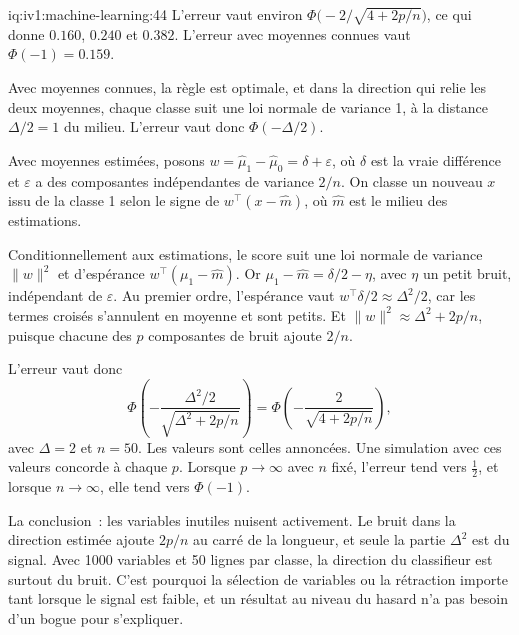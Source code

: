 \begin{solution}{iq:iv1:machine-learning:44}
L'erreur vaut environ $\Phi\bigl(-2/\sqrt{4 + 2p/n}\bigr)$, ce qui donne $0.160$, $0.240$ et $0.382$. L'erreur avec moyennes connues vaut $\Phi(-1) = 0.159$.

Avec moyennes connues, la règle est optimale, et dans la direction qui relie les deux moyennes, chaque classe suit une loi normale de variance 1, à la distance $\Delta/2 = 1$ du milieu. L'erreur vaut donc $\Phi(-\Delta/2)$.

Avec moyennes estimées, posons $w = \hat{\mu}_1 - \hat{\mu}_0 = \delta + \varepsilon$, où $\delta$ est la vraie différence et $\varepsilon$ a des composantes indépendantes de variance $2/n$. On classe un nouveau $x$ issu de la classe 1 selon le signe de $w^\top(x - \hat{m})$, où $\hat{m}$ est le milieu des estimations.

Conditionnellement aux estimations, le score suit une loi normale de variance $\|w\|^2$ et d'espérance $w^\top(\mu_1 - \hat{m})$. Or $\mu_1 - \hat{m} = \delta/2 - \eta$, avec $\eta$ un petit bruit, indépendant de $\varepsilon$. Au premier ordre, l'espérance vaut $w^\top\delta/2 \approx \Delta^2/2$, car les termes croisés s'annulent en moyenne et sont petits. Et $\|w\|^2 \approx \Delta^2 + 2p/n$, puisque chacune des $p$ composantes de bruit ajoute $2/n$.

L'erreur vaut donc
\[
\Phi\left(-\frac{\Delta^2/2}{\sqrt{\Delta^2 + 2p/n}}\right) = \Phi\left(-\frac{2}{\sqrt{4 + 2p/n}}\right),
\]
avec $\Delta = 2$ et $n = 50$. Les valeurs sont celles annoncées. Une simulation avec ces valeurs concorde à chaque $p$. Lorsque $p \to \infty$ avec $n$ fixé, l'erreur tend vers $\frac12$, et lorsque $n \to \infty$, elle tend vers $\Phi(-1)$.

La conclusion~: les variables inutiles nuisent activement. Le bruit dans la direction estimée ajoute $2p/n$ au carré de la longueur, et seule la partie $\Delta^2$ est du signal. Avec 1000 variables et 50 lignes par classe, la direction du classifieur est surtout du bruit. C'est pourquoi la sélection de variables ou la rétraction importe tant lorsque le signal est faible, et un résultat au niveau du hasard n'a pas besoin d'un bogue pour s'expliquer.



\end{solution}

